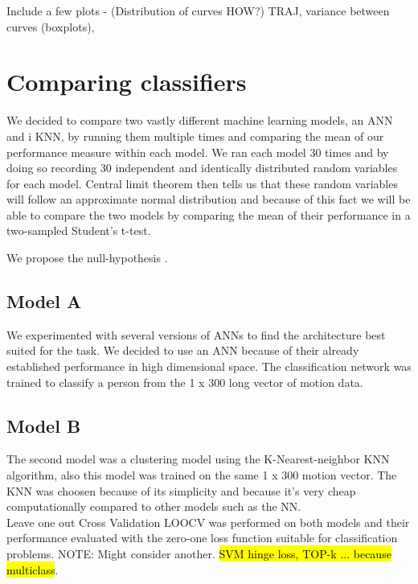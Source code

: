 \documentclass{article}
\begin{document}
Include a few plots - (Distribution of curves HOW?)
TRAJ, variance between curves (boxplots), 

\section{Comparing classifiers}
We decided to compare two vastly different machine learning models, an ANN and i KNN, by running them multiple times and comparing the mean of our performance measure within each model. We ran each model 30 times and by doing so recording 30 independent and identically distributed random variables for each model. Central limit theorem then tells us that these random variables will follow an approximate normal distribution and because of this fact we will be able to compare the two models by comparing the mean of their performance in a two-sampled Student's t-test.

We propose the null-hypothesis . 
\subsection{Model A}
We experimented with several versions of ANNs to find the  architecture best suited for the task. We decided to use an ANN because of their already established performance in high dimensional space. The classification network was trained to classify a person from the 1 x 300 long vector of motion data.   


\subsection{Model B}
The second model was a clustering model using the K-Nearest-neighbor KNN algorithm, also this model was trained on the same 1 x 300 motion vector.
The KNN was choosen because of its simplicity and because it's very cheap computationally compared to other models such as the NN.
\\
Leave one out Cross Validation LOOCV was performed on both models and their performance evaluated with the zero-one loss function suitable for classification problems. NOTE: Might consider another. \hl{SVM hinge loss, TOP-k ... because multiclass}.
\end{document}
